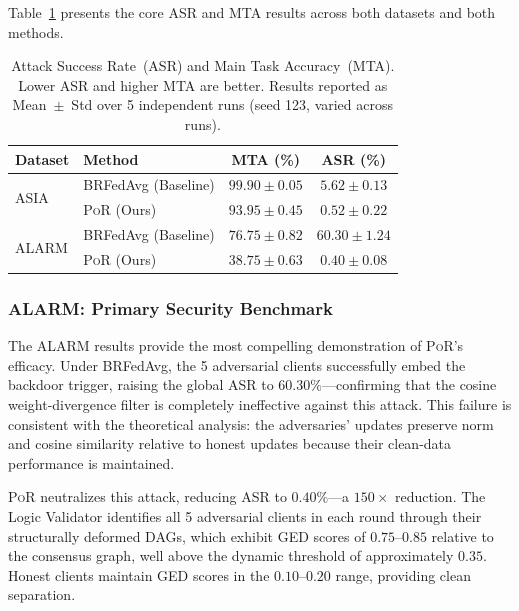 \documentclass[journal]{IEEEtran}
\newcommand{\por}{\textsc{PoR}}
\begin{document}
Table~\ref{tab:main_results} presents the core ASR and MTA results across
both datasets and both methods.

\begin{table}[!tp]
\centering
\caption{Attack Success Rate~(ASR) and Main Task Accuracy~(MTA).
         Lower ASR and higher MTA are better. Results reported as
         Mean~$\pm$~Std over 5 independent runs (seed 123, varied across runs).}
\label{tab:main_results}
\renewcommand{\arraystretch}{1.3}
\setlength{\tabcolsep}{5pt}
\begin{tabular}{llcc}
\toprule
\textbf{Dataset} & \textbf{Method} & \textbf{MTA (\%)} & \textbf{ASR (\%)} \\
\midrule
\multirow{2}{*}{ASIA}
  & BRFedAvg (Baseline)   & $99.90 \pm 0.05$ & $5.62 \pm 0.13$ \\
  & \por{} (Ours)         & $93.95 \pm 0.45$ & $\bm{0.52} \pm 0.22$ \\
\midrule
\multirow{2}{*}{ALARM}
  & BRFedAvg (Baseline)   & $76.75 \pm 0.82$ & $60.30 \pm 1.24$ \\
  & \por{} (Ours)         & $38.75 \pm 0.63$ & $\bm{0.40} \pm 0.08$ \\
\bottomrule
\end{tabular}
\end{table}

\subsubsection{ALARM: Primary Security Benchmark}

The ALARM results provide the most compelling demonstration of \por{}'s
efficacy. Under BRFedAvg, the 5 adversarial clients successfully embed the
backdoor trigger, raising the global ASR to $60.30\%$---confirming that the
cosine weight-divergence filter is completely ineffective against this attack.
This failure is consistent with the theoretical analysis: the adversaries'
updates preserve norm and cosine similarity relative to honest updates because
their clean-data performance is maintained.

\por{} neutralizes this attack, reducing ASR to $\mathbf{0.40\%}$---a
$150\times$ reduction. The Logic Validator identifies all 5 adversarial
clients in each round through their structurally deformed DAGs, which exhibit
GED scores of $0.75$--$0.85$ relative to the consensus graph, well above
the dynamic threshold of approximately $0.35$. Honest clients maintain GED
scores in the $0.10$--$0.20$ range, providing clean separation.
\end{document}
